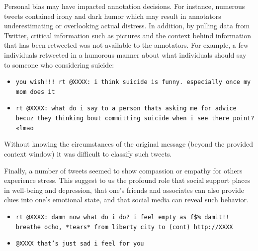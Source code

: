\documentclass[11pt]{article}
\begin{document}
Personal bias may have impacted annotation decisions. For instance, numerous tweets contained irony and dark humor which may result in annotators underestimating or overlooking actual distress. In addition, by pulling data from Twitter, critical information such as pictures and the context behind information that has been retweeted was not available to the annotators.  For example, a few individuals retweeted in a humorous manner about what individuals should say to someone who considering suicide:

\begin{itemize}
\footnotesize
\item \texttt{you wish!!! rt @XXXX: i think suicide is funny. especially once my mom does it}
\item \texttt{rt @XXXX: what do i say to a person thats asking me for advice becuz they thinking bout committing suicide when i see there point? «lmao}
\end{itemize}
Without knowing the circumstances of the original message (beyond the provided context window) it was difficult to classify such tweets.  %

Finally, a number of tweets seemed to show compassion or empathy for others experience stress. This suggest to us the profound role that social support places in well-being and depression, that one's friends and associates can also provide clues into one's emotional state, and that social media can reveal such behavior.

\begin{itemize}
\footnotesize
\item \texttt{rt @XXXX: damn now what do i do? i feel empty as f\$\% damit!! breathe ocho, *tears* from liberty city to (cont) http://XXXX}
\item \texttt{@XXXX that's just sad i feel for you }
\end{itemize}
\end{document}
